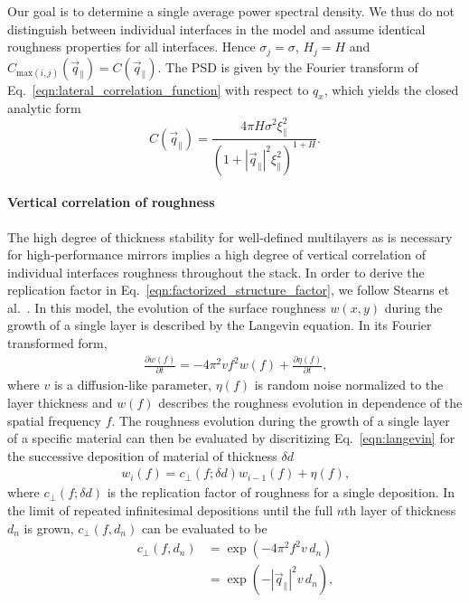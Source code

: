 Our goal is to determine a single average power spectral density. We thus do not distinguish between individual interfaces in the model and assume identical roughness properties for all interfaces. Hence $\sigma_j = \sigma$, $H_j = H$ and $C_{\text{max}(i,j)}(\vec{q}_\parallel) = C(\vec{q}_\parallel)$. The PSD is given by the Fourier transform of Eq.~\eqref{eqn:lateral_correlation_function} with respect to $q_x$, which yields the closed analytic form
\begin{equation}
        C(\vec{q}_\parallel) = \frac{4 \pi H \sigma^2 \xi_\parallel^2}{(1+|\vec{q}_\parallel|^2\xi_\parallel^2)^{1+H}} \text{.} \label{eqn:psd} 
\end{equation}

\paragraph{Vertical correlation of roughness}
The high degree of thickness stability for well-defined multilayers as is necessary for high-performance mirrors implies a high degree of vertical correlation of individual interfaces roughness throughout the stack. In order to derive the replication factor in Eq.~\eqref{eqn:factorized_structure_factor}, we follow Stearns et al.~\cite{stearns_x-ray_1992}. In this model, the evolution of the surface roughness $w(x,y)$ during the growth of a single layer is described by the Langevin equation. In its Fourier transformed form, 
\begin{align}
\frac{\partial w(f)}{\partial t} = - 4 \pi^2 v f^2 w(f) + \frac{\partial \eta(f)}{\partial t} \text{,} \label{eqn:langevin}
\end{align}
where $v$ is a diffusion-like parameter, $\eta(f)$ is random noise normalized to the layer thickness and $w(f)$ describes the roughness evolution in dependence of the spatial frequency $f$. The roughness evolution during the growth of a single layer of a specific material can then be evaluated by discritizing Eq.~\eqref{eqn:langevin} for the successive deposition of material of thickness $\delta d$
\begin{align}
w_i(f) = c_\perp(f;\delta d) w_{i-1}(f) + \eta(f) \text{,}
\end{align}
where $c_\perp(f;\delta d)$ is the replication factor of roughness for a single deposition. In the limit of repeated infinitesimal depositions until the full $n$th layer of thickness $d_n$ is grown, $c_\perp(f,d_n)$ can be evaluated to be \cite{spiller_multilayer_1993}
\begin{align}
    c_\perp(f,d_n) &= \exp(-4\pi^2 f^2 v \,d_n) \nonumber \\
                   &= \exp(-|\vec{q}_\parallel|^2 v \,d_n)\text{,}
\end{align}
